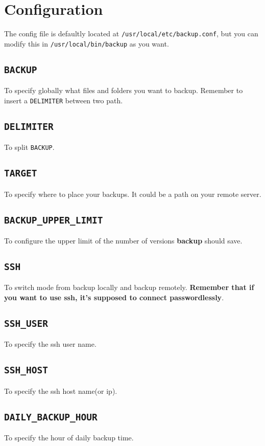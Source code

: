 \documentclass[a4paper]{article}
\begin{document}
\section{Configuration}
The config file is defaultly located at {\large\tt /usr/local/etc/backup.conf}, but you can modify this in {\large\tt /usr/local/bin/backup} as you want.

\subsection{{\large\tt BACKUP}}
To specify globally what files and folders you want to backup. Remember to insert a {\large\tt DELIMITER} between two path.

\subsection{{\large\tt DELIMITER}}
To split {\large\tt BACKUP}.

\subsection{{\large\tt TARGET}}
To specify where to place your backups. It could be a path on your remote server.

\subsection{{\large\tt BACKUP\_UPPER\_LIMIT}}
To configure the upper limit of the number of versions \textbf{backup} should save.

\subsection{{\large\tt SSH}}
To switch mode from backup locally and backup remotely. \textbf{Remember that if you want to use ssh, it's supposed to connect passwordlessly}.

\subsection{{\large\tt SSH\_USER}}
To specify the ssh user name.

\subsection{{\large\tt SSH\_HOST}}
To specify the ssh host name(or ip).

\subsection{{\large\tt DAILY\_BACKUP\_HOUR}}
To specify the hour of daily backup time.
\end{document}
